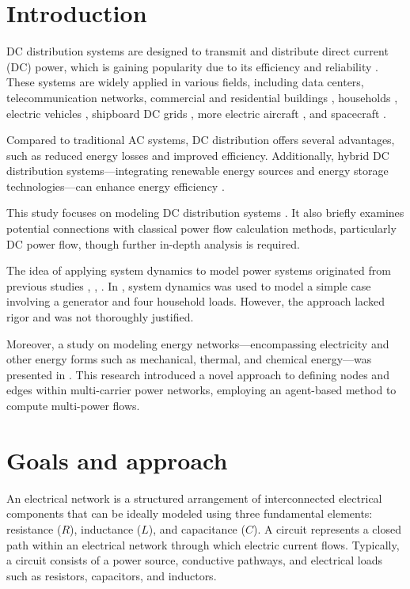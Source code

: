 \documentclass[11pt, a4paper]{article}
\theoremstyle{definition}
\theoremstyle{plain}
\theoremstyle{plain}
\theoremstyle{remark}
\theoremstyle{remark}
\theoremstyle{remark}
\begin{document}
\section{Introduction}

DC distribution systems are designed to transmit and distribute direct current (DC) power, which is gaining popularity due to its efficiency and reliability \cite{Prabhala2014}. These systems are widely applied in various fields, including data centers, telecommunication networks, commercial and residential buildings \cite{Ore2020}, households \cite{Siraj2020}, electric vehicles \cite{Tabari2013}, shipboard DC grids \cite{Kurniawan2023}, more electric aircraft \cite{Buticchi2019}, and spacecraft \cite{Recalde2020}.

Compared to traditional AC systems, DC distribution offers several advantages, such as reduced energy losses and improved efficiency. Additionally, hybrid DC distribution systems—integrating renewable energy sources and energy storage technologies—can enhance energy efficiency \cite{Durana2018}.


This study focuses on modeling DC distribution systems \cite{Montoya2018}. It also briefly examines potential connections with classical power flow calculation methods, particularly DC power flow, though further in-depth analysis is required.

The idea of applying system dynamics to model power systems originated from previous studies \cite{Durana2009}, \cite{kremers10}, \cite{Durana2018}. In \cite{Durana2018}, system dynamics was used to model a simple case involving a generator and four household loads. However, the approach lacked rigor and was not thoroughly justified.

Moreover, a study on modeling energy networks—encompassing electricity and other energy forms such as mechanical, thermal, and chemical energy—was presented in \cite{Durana2014}. This research introduced a novel approach to defining nodes and edges within multi-carrier power networks, employing an agent-based method to compute multi-power flows.

\section{Goals and approach}

An electrical network is a structured arrangement of interconnected electrical components that can be ideally modeled using three fundamental elements: resistance ($ R $), inductance ($ L $), and capacitance ($ C $). A circuit represents a closed path within an electrical network through which electric current flows. Typically, a circuit consists of a power source, conductive pathways, and electrical loads such as resistors, capacitors, and inductors.
\end{document}
